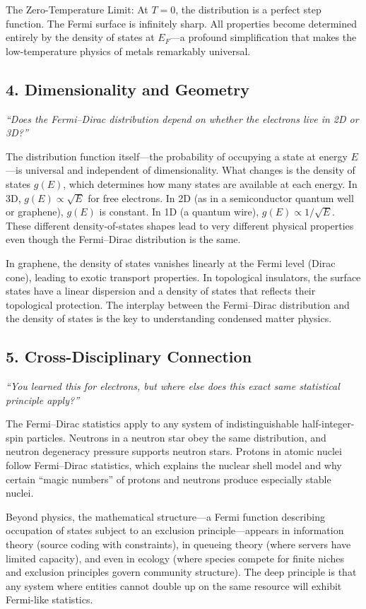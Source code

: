 \documentclass[11pt,openright]{book}
\begin{document}
The Zero-Temperature Limit: At $T = 0$, the distribution is a perfect step function. The Fermi surface is infinitely sharp. All properties become determined entirely by the density of states at $E_F$---a profound simplification that makes the low-temperature physics of metals remarkably universal.

\subsection*{4. Dimensionality and Geometry}
\textit{``Does the Fermi--Dirac distribution depend on whether the electrons live in 2D or 3D?''}

The distribution function itself---the probability of occupying a state at energy $E$---is universal and independent of dimensionality. What changes is the density of states $g(E)$, which determines how many states are available at each energy. In 3D, $g(E) \propto \sqrt{E}$ for free electrons. In 2D (as in a semiconductor quantum well or graphene), $g(E)$ is constant. In 1D (a quantum wire), $g(E) \propto 1/\sqrt{E}$. These different density-of-states shapes lead to very different physical properties even though the Fermi--Dirac distribution is the same.

In graphene, the density of states vanishes linearly at the Fermi level (Dirac cone), leading to exotic transport properties. In topological insulators, the surface states have a linear dispersion and a density of states that reflects their topological protection. The interplay between the Fermi--Dirac distribution and the density of states is the key to understanding condensed matter physics.

\subsection*{5. Cross-Disciplinary Connection}
\textit{``You learned this for electrons, but where else does this exact same statistical principle apply?''}

The Fermi--Dirac statistics apply to any system of indistinguishable half-integer-spin particles. Neutrons in a neutron star obey the same distribution, and neutron degeneracy pressure supports neutron stars. Protons in atomic nuclei follow Fermi--Dirac statistics, which explains the nuclear shell model and why certain ``magic numbers'' of protons and neutrons produce especially stable nuclei.

Beyond physics, the mathematical structure---a Fermi function describing occupation of states subject to an exclusion principle---appears in information theory (source coding with constraints), in queueing theory (where servers have limited capacity), and even in ecology (where species compete for finite niches and exclusion principles govern community structure). The deep principle is that any system where entities cannot double up on the same resource will exhibit Fermi-like statistics.
\end{document}
